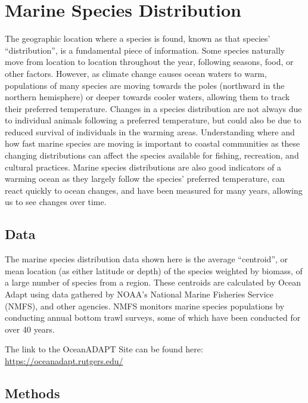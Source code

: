 \documentclass[
]{book}
\begin{document}
\hypertarget{marine-species-distribution}{%
\chapter{Marine Species Distribution}\label{marine-species-distribution}}

The geographic location where a species is found, known as that species' ``distribution'', is a fundamental piece of information. Some species naturally move from location to location throughout the year, following seasons, food, or other factors. However, as climate change causes ocean waters to warm, populations of many species are moving towards the poles (northward in the northern hemisphere) or deeper towards cooler waters, allowing them to track their preferred temperature. Changes in a species distribution are not always due to individual animals following a preferred temperature, but could also be due to reduced survival of individuals in the warming areas. Understanding where and how fast marine species are moving is important to coastal communities as these changing distributions can affect the species available for fishing, recreation, and cultural practices. Marine species distributions are also good indicators of a warming ocean as they largely follow the species' preferred temperature, can react quickly to ocean changes, and have been measured for many years, allowing us to see changes over time.

\hypertarget{data-7}{%
\section{Data}\label{data-7}}

The marine species distribution data shown here is the average ``centroid'', or mean location (as either latitude or depth) of the species weighted by biomass, of a large number of species from a region. These centroids are calculated by Ocean Adapt using data gathered by NOAA's National Marine Fisheries Service (NMFS), and other agencies. NMFS monitors marine species populations by conducting annual bottom trawl surveys, some of which have been conducted for over 40 years.

The link to the OceanADAPT Site can be found here: \url{https://oceanadapt.rutgers.edu/}

\hypertarget{methods-7}{%
\section{Methods}\label{methods-7}}
\end{document}
